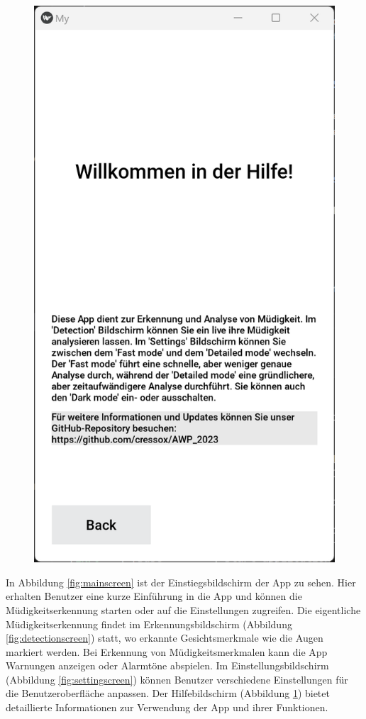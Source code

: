 \begin{figure}[h]
\begin{minipage}[b]{0.22\textwidth}
		\includegraphics[width=\linewidth]{images/helpscreen.png}
		\caption{}
		\label{fig:helpscreen}
	\end{minipage}
\end{figure}

In Abbildung \ref{fig:mainscreen} ist der Einstiegsbildschirm der App zu sehen. Hier erhalten Benutzer eine kurze Einführung in die App und können die Müdigkeitserkennung starten oder auf die Einstellungen zugreifen. Die eigentliche Müdigkeitserkennung findet im Erkennungsbildschirm (Abbildung \ref{fig:detectionscreen}) statt, wo erkannte Gesichtsmerkmale wie die Augen markiert werden. Bei Erkennung von Müdigkeitsmerkmalen kann die App Warnungen anzeigen oder Alarmtöne abspielen. Im Einstellungsbildschirm (Abbildung \ref{fig:settingscreen}) können Benutzer verschiedene Einstellungen für die Benutzeroberfläche anpassen. Der Hilfebildschirm (Abbildung \ref{fig:helpscreen}) bietet detaillierte Informationen zur Verwendung der App und ihrer Funktionen.
